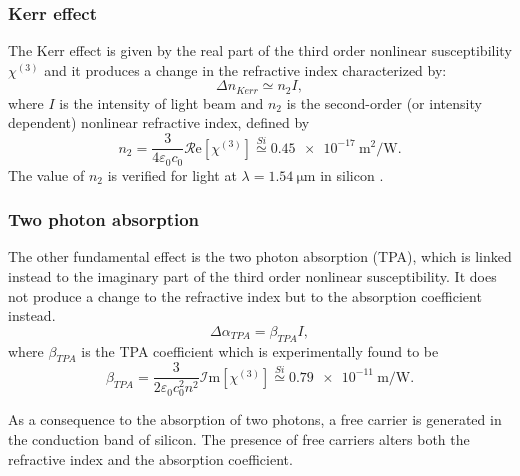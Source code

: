 \subsubsection{Kerr effect}
The Kerr effect is given by the real part of the third order nonlinear susceptibility $\chi^{(3)}$ and it produces a change in the refractive index characterized by:
\begin{equation}
	\Delta n_{Kerr} \simeq n_2 I,
\end{equation}
where $I$ is the intensity of light beam and $n_2$ is the second-order (or intensity dependent) nonlinear refractive index, defined by
\begin{equation}
	n_2 = \dfrac{3}{4\varepsilon_0 c_0} \mathcal{R}\mathrm{e} \left[ \chi^{(3)} \right]
	\overset{Si}{\simeq} \SI{0.45e-17}{\square\m\per\W}.
\end{equation}
The value of $n_2$ is verified for light at $\lambda=\SI{1.54}{\um}$ in silicon \cite{chen2012bistability}.

\subsubsection{Two photon absorption}
The other fundamental effect is the two photon absorption (TPA), which is linked instead to the imaginary part of the third order nonlinear susceptibility.
It does not produce a change to the refractive index but to the absorption coefficient instead.
\begin{equation}
	\Delta\alpha_{TPA} = \beta_{TPA} I,
\end{equation}
where $\beta_{TPA}$ is the TPA coefficient which is experimentally found to be \cite{chen2012bistability}
\begin{equation}
	\beta_{TPA} = \dfrac{3}{2\varepsilon_0 c_0^2n^2} \mathcal{I}\mathrm{m} \left[ \chi^{(3)} \right]
	\overset{Si}{\simeq} \SI{0.79e-11}{\m\per\W}.
\end{equation}

As a consequence to the absorption of two photons, a free carrier is generated in the conduction band of silicon.
The presence of free carriers alters both the refractive index and the absorption coefficient.

